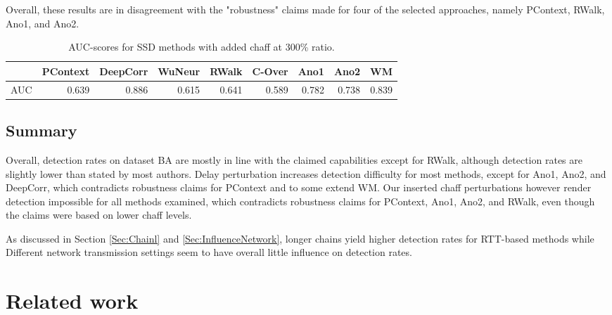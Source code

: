 \documentclass[runningheads,11pt]{llncs}\usepackage[]{graphicx}\usepackage[]{color}
\begin{document}
Overall, these results are in disagreement with the "robustness" claims made for four of the selected approaches, namely PContext, RWalk, Ano1, and Ano2.

\begin{table}
\centering
\begin{tabular}{l|r|r|r|r|r|r|r|r}
  \hline
 & PContext & DeepCorr & WuNeur & RWalk & C-Over & Ano1 & Ano2 & WM \\ 
  \hline
AUC & 0.639 & 0.886 & 0.615 & 0.641 & 0.589 & 0.782 & 0.738 & 0.839 \\ 
   \hline
\end{tabular}

\caption{AUC-scores for SSD methods with added chaff at 300\% ratio.}\label{Tab:AUCchaff}
\vspace{-0.7cm}
\end{table}



\subsection{Summary}

Overall, detection rates on dataset BA are mostly in line with the claimed capabilities except for RWalk, although detection rates are slightly lower than stated by most authors. Delay perturbation increases detection difficulty for most methods, except for Ano1, Ano2, and DeepCorr, which contradicts robustness claims for PContext and to some extend WM. Our inserted chaff perturbations however render detection impossible for all methods examined, which contradicts robustness claims for PContext, Ano1, Ano2, and RWalk, even though the claims were based on lower chaff levels. 

As discussed in Section \ref{Sec:Chainl} and \ref{Sec:InfluenceNetwork}, longer chains yield higher detection rates for RTT-based methods while Different network transmission settings seem to have overall little influence on detection rates. 


\section{Related work}\label{Sec:Relatedwork}
\end{document}
